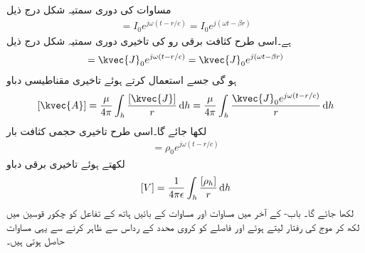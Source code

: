 مساوات  کی دوری سمتیہ شکل درج ذیل
\begin{align}
[I]=I_0 e^{j \omega (t-r/c)}=I_0 e^{j(\omega t-\beta r)}
\end{align}
ہے۔اسی طرح کثافت برقی رو کی تاخیری دوری سمتیہ شکل درج ذیل
\begin{align}
[\kvec{J}]=\kvec{J}_0 e^{j \omega (t-r/c)}=\kvec{J}_0 e^{j(\omega  t -\beta r)}
\end{align}
ہو گی جسے استعمال کرتے ہوئے تاخیری مقناطیسی دباو
\begin{align}\label{مساوات_اینٹینا_تاخیری_سمتی_دباو}
[\kvec{A}]=\frac{\mu}{4\pi}\int_h \frac{[\kvec{J}]}{r}\dif h=\frac{\mu}{4\pi}\int_h \frac{\kvec{J}_0 e^{j\omega(t-r/c)}}{r} \dif h
\end{align}
لکھا جائے گا۔اسی طرح تاخیری حجمی کثافت بار
\begin{align}
[\rho_h]= \rho_0 e^{j\omega \left(t-r/c \right)}
\end{align}
لکھتے ہوئے تاخیری برقی دباو
\begin{align}\label{مساوات_اینٹینا_تاخیری_غیر_سمتی_دباو}
[V]=\frac{1}{4\pi \epsilon}\int_h \frac{[\rho_h]}{ r} \dif h
\end{align}
لکھا جائے گا۔ باب- کے آخر میں مساوات  اور مساوات  کے بائیں ہاتھ کے تفاعل کو چکور قوسین میں لکھ کر موج کی رفتار  لیتے ہوئے اور فاصلے  کو کروی محدد کے رداس  سے ظاہر کرنے سے  یہی مساوات حاصل ہوتی ہیں۔

